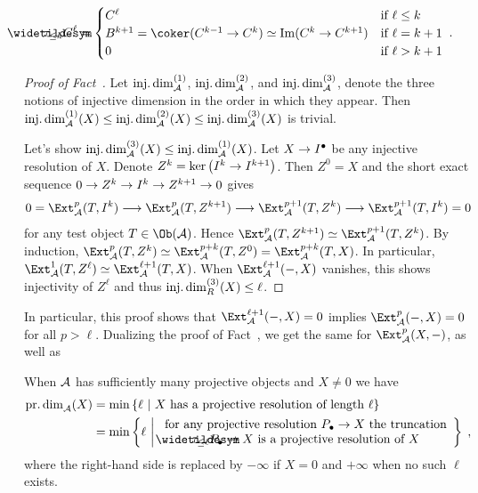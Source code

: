 \documentclass[a4paper,parskip=half,numbers=enddot, DIV=12]{scrreprt}
\begin{document}
\begin{align*}
\snake{\tau}_{\leq k}C^\ell=\begin{cases}
C^\ell & \text{if }\ell\leq k\\
B^{k+1}=\coker(C^{k-1}\morphism C^k)\simeq \Im(C^k\morphism C^{k+1}) & \text{if }\ell=k+1\\
0 & \text{if }\ell>k+1
\end{cases}\;.
\end{align*}
\begin{proof}[Proof of Fact~]
	Let $\operatorname{inj.dim}_{\mathcal{A}}^{(1)}$, $\operatorname{inj.dim}_{\mathcal{A}}^{(2)}$, and $\operatorname{inj.dim}_{\mathcal{A}}^{(3)}$,  denote the three notions of injective dimension in the order in which they appear. Then $\operatorname{inj.dim}_{\mathcal{A}}^{(1)}(X)\leq \operatorname{inj.dim}_{\mathcal{A}}^{(2)}(X)\leq \operatorname{inj.dim}_{\mathcal{A}}^{(3)}(X)$ is trivial.
	
	Let's show $\operatorname{inj.dim}_{\mathcal{A}}^{(3)}(X)\leq \operatorname{inj.dim}_{\mathcal{A}}^{(1)}(X)$. Let $X\morphism I^\bullet$ be any injective resolution of $X$. Denote $Z^k=\ker\left(I^k\morphism I^{k+1}\right)$. Then $Z^0=X$ and the short exact sequence $0\morphism Z^k\morphism I^k\morphism Z^{k+1}\morphism 0$ gives
	\begin{align*}
		0=\Ext_\Aa^p(T,I^k)\morphism \Ext_\Aa^p(T,Z^{k+1})\morphism\Ext_\Aa^{p+1}(T,Z^k)\morphism\Ext_\Aa^{p+1}(T,I^k)=0
	\end{align*}
	for any test object $T\in\Ob(\Aa)$. Hence $\Ext_\Aa^p(T,Z^{k+1})\simeq \Ext_\Aa^{p+1}(T,Z^k)$. By induction, $\Ext_\Aa^p(T,Z^k)\simeq \Ext_\Aa^{p+k}(T,Z^0)=\Ext_\Aa^{p+k}(T,X)$. In particular, $\Ext_\Aa^1(T,Z^\ell)\simeq \Ext_\Aa^{\ell+1}(T,X)$. When $\Ext_\Aa^{\ell+1}(-,X)$ vanishes, this shows injectivity of $Z^\ell$ and thus $\operatorname{inj.dim}_R^{(3)}(X)\leq \ell$.
\end{proof}
In particular, this proof shows that $\Ext_\Aa^{\ell+1}(-,X)=0$ implies $\Ext_\Aa^p(-,X)=0$ for all $p>\ell$. Dualizing the proof of Fact~, we get the same for $\Ext_\Aa^p(X,-)$, as well as 
\begin{fact}
	When $\mathcal{A}$ has sufficiently many projective objects and $X\neq 0$ we have
	\begin{align*}
	\pdim_\Aa(X)&=\min\left\{\ell\st X\text{ has a projective resolution of length }\ell\right\}\\
	&=	\min\left\{\ell\st\begin{array}{c}
	\text{for any projective resolution }P_\bullet\morphism X\text{ the truncation}\\
	\snake{\tau}_{\leq\ell}P_\bullet\morphism X\text{ is a projective resolution of }X
	\end{array}
	\right\}\;,
	\end{align*}
	where the right-hand side is replaced by $-\infty$ if $X=0$ and $+\infty$ when no such $\ell$ exists.
\end{fact}
\end{document}
